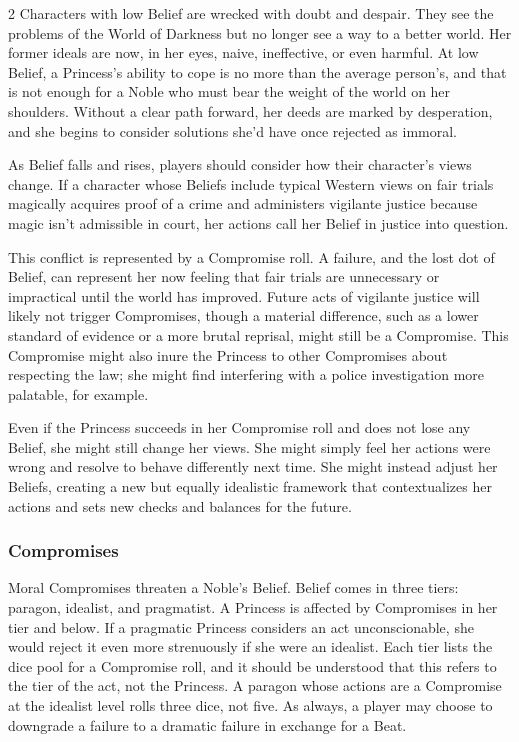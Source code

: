 \begin{multicols}{2}
Characters with low Belief are wrecked with doubt and despair. They see the problems of the World of Darkness but no longer see a way to a better world. Her former ideals are now, in her eyes, naive, ineffective, or even harmful. At low Belief, a Princess's ability to cope is no more than the average person's, and that is not enough for a Noble who must bear the weight of the world on her shoulders. Without a clear path forward, her deeds are marked by desperation, and she begins to consider solutions she'd have once rejected as immoral.

As Belief falls and rises, players should consider how their character's views change. If a character \textemdash whose Beliefs include typical Western views on fair trials \textemdash magically acquires proof of a crime and administers vigilante justice because magic isn't admissible in court, her actions call her Belief in justice into question. 

This conflict is represented by a Compromise roll. A failure, and the lost dot of Belief, can represent her now feeling that fair trials are unnecessary or impractical until the world has improved. Future acts of vigilante justice will likely not trigger Compromises, though a material difference, such as a lower standard of evidence or a more brutal reprisal, might still be a Compromise. This Compromise might also inure the Princess to other Compromises about respecting the law; she might find interfering with a police investigation more palatable, for example. 

Even if the Princess succeeds in her Compromise roll and does not lose any Belief, she might still change her views. She might simply feel her actions were wrong and resolve to behave differently next time. She might instead adjust her Beliefs, creating a new but equally idealistic framework that contextualizes her actions and sets new checks and balances for the future.

\subsubsection*{Compromises}

Moral Compromises threaten a Noble's Belief. Belief comes in three tiers: paragon, idealist, and pragmatist. A Princess is affected by Compromises in her tier and below. If a pragmatic Princess considers an act unconscionable, she would reject it even more strenuously if she were an idealist. Each tier lists the dice pool for a Compromise roll, and it should be understood that this refers to the tier of the act, not the Princess. A paragon whose actions are a Compromise at the idealist level rolls three dice, not five. As always, a player may choose to downgrade a failure to a dramatic failure in exchange for a Beat. 


\end{multicols}
